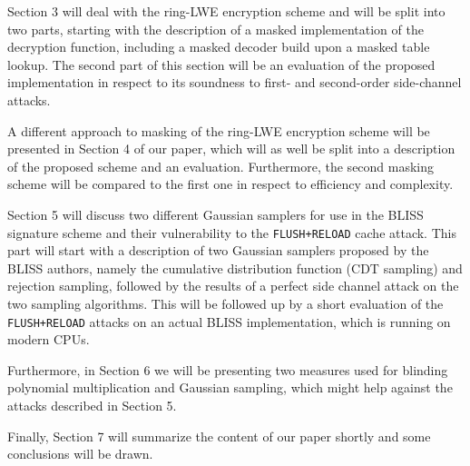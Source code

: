 Section 3 will deal with the ring-LWE encryption scheme and will be split into two parts, starting with the description of a masked implementation of the decryption function, including a masked decoder build upon a masked table lookup. The second part of this section will be an evaluation of the proposed implementation in respect to its soundness to first- and second-order side-channel attacks.

A different approach to masking of the \ac{ring-LWE} encryption scheme will be presented in Section 4 of our paper, which will as well be split into a description of the proposed scheme and an evaluation. Furthermore, the second masking scheme will be compared to the first one in respect to efficiency and complexity.

Section 5 will discuss two different Gaussian samplers for use in the BLISS signature scheme and their vulnerability to the \verb|FLUSH+RELOAD| cache attack. This part will start with a description of two Gaussian samplers proposed by the BLISS authors, namely the cumulative distribution function (CDT sampling) and rejection sampling, followed by the results of a perfect side channel attack on the two sampling algorithms. This will be followed up by a short evaluation of the \verb|FLUSH+RELOAD| attacks on an actual BLISS implementation, which is running on modern CPUs.

Furthermore, in Section 6 we will be presenting two measures used for blinding polynomial multiplication and Gaussian sampling, which might help against the attacks described in Section 5.

Finally, Section 7 will summarize the content of our paper shortly and some conclusions will be drawn.